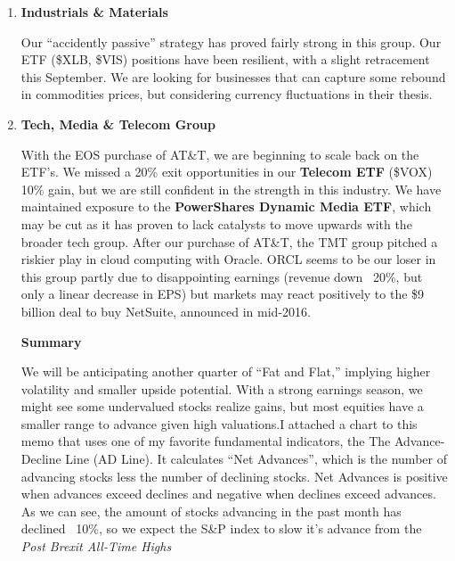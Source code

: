\documentclass[11pt,pressrelease]{newlfm} %
\begin{document}
\begin{newlfm}
\begin{singlespace}
\begin{enumerate}
\item \textbf{Industrials \& Materials} \par
Our ``accidently passive'' strategy has proved fairly strong in this group.  Our ETF (\$XLB, \$VIS) positions have been resilient, with a slight retracement this September. We are looking for businesses that can capture some rebound in commodities prices, but considering currency fluctuations in their thesis. 

\item  \textbf{Tech, Media \& Telecom Group} \par
With the EOS purchase of AT\&T, we are beginning to scale back on the ETF's. We missed a 20\% exit opportunities in our \textbf{Telecom ETF} (\$VOX) 10\% gain, but we are still confident in the strength in this industry. We have maintained exposure to the \textbf{PowerShares Dynamic Media ETF}, which may be cut as it has proven to lack catalysts to move upwards with the broader tech group. After our purchase of AT\&T, the TMT group pitched a riskier play in cloud computing with Oracle. ORCL seems to be our loser in this group partly due to disappointing earnings (revenue down ~20\%, but only a linear decrease in EPS) but markets may react positively to the \$9 billion deal to buy NetSuite, announced in mid-2016.\par


\center \textbf{Summary} \par
\raggedright
We will be anticipating another quarter of ``Fat and Flat,'' implying higher volatility and smaller upside potential. With a strong earnings season, we might see some undervalued stocks realize gains, but most equities have a smaller range to advance given high valuations.I attached a chart to this memo that uses one of my favorite fundamental indicators, the The Advance-Decline Line (AD Line). It calculates ``Net Advances'', which is the number of advancing stocks less the number of declining stocks. Net Advances is positive when advances exceed declines and negative when declines exceed advances. As we can see, the amount of stocks advancing in the past month has declined ~10\%, so we expect the S\&P index to slow it's advance from the \textit{Post Brexit All-Time Highs}


\end{enumerate}
\end{singlespace}
\end{newlfm}
\end{document}
